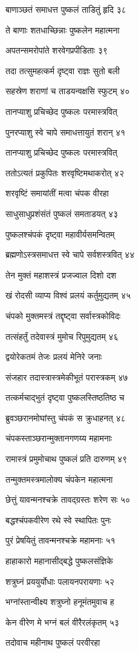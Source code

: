 बाणाञ्छतं समाधत्त पुष्कलं ताडितुं हृदि ३८

ते बाणाः शतधाच्छिन्नाः पुष्कलेन महात्मना

अपतन्समरोपांते शरवेगप्रपीडिताः ३९

तदा तत्सुमहत्कर्म दृष्ट्वा राज्ञः सुतो बली

सहस्रेण शराणां च ताडयन्वक्षसि स्फुटम् ४०

तानप्याशु प्रचिच्छेद पुष्कलः परमास्त्रवित्

पुनरप्याशु स्वे चापे समाधत्तायुतं शरान् ४१

तानप्याशु प्रचिच्छेद पुष्कलः परमास्त्रवित्

ततोऽत्यतं प्रकुपितः शरवृष्टिमथाकरोत् ४२

शरवृष्टिं समायांतीं मत्वा चंपक वीरहा

साधुसाधुप्रशंसंतं पुष्कलं समताडयत् ४३

पुष्कलश्चंपकं दृष्ट्वा महावीर्यसमन्वितम्

ब्रह्मणोऽस्त्रसमाधत्त स्वे चापे सर्वशस्त्रवित् ४४

तेन मुक्तं महाशस्त्रं प्रजज्वाल दिशो दश

खं रोदसी व्याप्य विश्वं प्रलयं कर्तुमुद्यतम् ४५

चंपको मुक्तमस्त्रं तद्दृष्ट्वा सर्वास्त्रकोविदः

तत्संहर्तुं तदेवास्त्रं मुमोच रिपुमुद्यतम् ४६

द्वयोरेकतमं तेजः प्रलयं मेनिरे जनाः

संजहार तदास्त्रास्त्रमेकीभूतं परास्त्रकम् ४७

तत्कर्मचाद्भुतं दृष्ट्वा पुष्कलस्तिष्ठतिष्ठ च

ब्रुवञ्छरानमोघांस्तु चंपकं स क्रुधाहनत् ४८

चंपकस्ताञ्छरान्मुक्तानगणय्य महामनाः

रामास्त्रं प्रमुमोचाथ पुष्कलं प्रति दारुणम् ४९

तन्मुक्तमस्त्रमालोक्य चंपकेन महात्मना

छेत्तुं यावन्मनश्चक्रे तावद्ग्रस्तः शरेण सः ५०

बद्धश्चंपकवीरेण रथे स्वे स्थापितः पुनः

पुरं प्रेषयितुं तावन्मनश्चक्रे महामनाः ५१

हाहाकारो महानासीद्बद्धे पुष्कलसंज्ञिके

शत्रुघ्नं प्रययुर्योधाः पलायनपरायणाः ५२

भग्नांस्तान्वीक्ष्य शत्रुघ्नो हनूमंतमुवाच ह

केन वीरेण मे भग्नं बलं वीरैरलंकृतम् ५३

तदोवाच महीनाथ पुष्कलं परवीरहा

